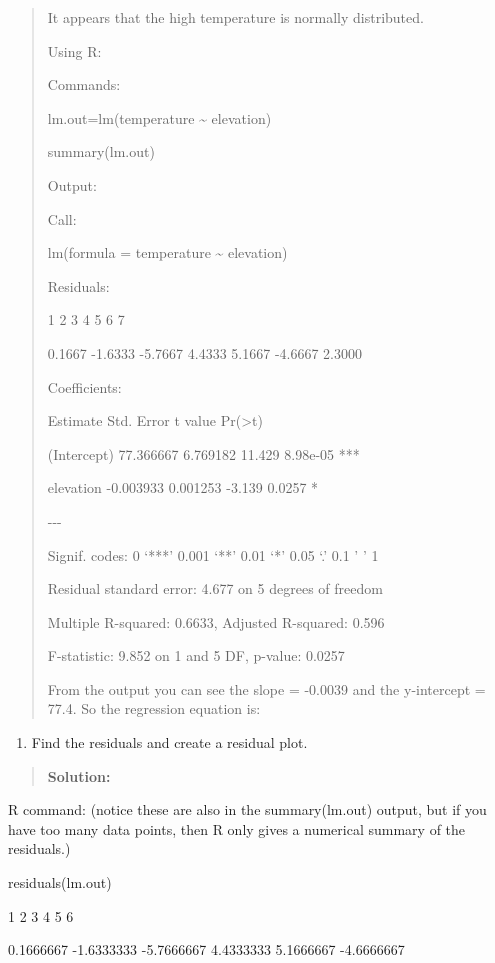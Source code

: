 \documentclass[]{book}
\providecommand{\tightlist}{%
  \setlength{\itemsep}{0pt}\setlength{\parskip}{0pt}}
\begin{document}
\begin{quote}
It appears that the high temperature is normally distributed.

Using R:

Commands:

lm.out=lm(temperature \textasciitilde{} elevation)

summary(lm.out)

Output:

Call:

lm(formula = temperature \textasciitilde{} elevation)

Residuals:

1 2 3 4 5 6 7

0.1667 -1.6333 -5.7667 4.4333 5.1667 -4.6667 2.3000

Coefficients:

Estimate Std. Error t value Pr(\textgreater{}\textbar{}t\textbar{})

(Intercept) 77.366667 6.769182 11.429 8.98e-05 ***

elevation -0.003933 0.001253 -3.139 0.0257 *

-\/-\/-

Signif. codes: 0 `***' 0.001 `**' 0.01 `*' 0.05 `.' 0.1 ' ' 1

Residual standard error: 4.677 on 5 degrees of freedom

Multiple R-squared: 0.6633, Adjusted R-squared: 0.596

F-statistic: 9.852 on 1 and 5 DF, p-value: 0.0257

From the output you can see the slope = -0.0039 and the y-intercept =
77.4. So the regression equation is:
\end{quote}

\begin{enumerate}
\def\labelenumi{\alph{enumi}.}
\setcounter{enumi}{2}
\tightlist
\item
  Find the residuals and create a residual plot.
\end{enumerate}

\begin{quote}
\textbf{Solution:}
\end{quote}

R command: (notice these are also in the summary(lm.out) output, but if
you have too many data points, then R only gives a numerical summary of
the residuals.)

residuals(lm.out)

1 2 3 4 5 6

0.1666667 -1.6333333 -5.7666667 4.4333333 5.1666667 -4.6666667
\end{document}

